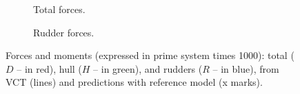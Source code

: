 \begin{figure}[h]
    \begin{center}
        
        \caption{}
        \label{fig:KVLCC2_HMRI}
    \end{center}
\end{figure}

\begin{figure}
    \centering
    \begin{subfigure}[b]{0.49\textwidth}
        \centering
        
        \caption{Total forces.}
        \label{fig:KVLCC2_HMRI_D}
    \end{subfigure}
    \hfill
    \begin{subfigure}[b]{0.49\textwidth}
        \centering
        
        \caption{Rudder forces.}
        \label{fig:KVLCC2_HMRI_R}
    \end{subfigure}
    \caption{Forces and moments (expressed in prime system times 1000): total ($D$ -- in red), hull ($H$ -- in green), and rudders ($R$ -- in blue), from VCT (lines) and predictions with reference model (x marks).}
    \label{fig:vct}
\end{figure}